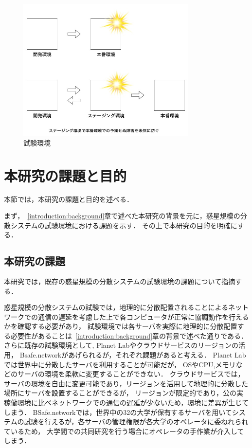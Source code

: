 \begin{figure}[htbp]
  \begin{center}
    \includegraphics[width=0.8\textwidth]{./figures/staging.jpg}
    \caption{試験環境}
  \end{center}
\end{figure}

\section{本研究の課題と目的}
\label{introduction:issue-aim}

本節では，本研究の課題と目的を述べる．

まず，~\ref{introduction:background}章で述べた本研究の背景を元に，惑星規模の分散システムの試験環境における課題を示す．
その上で本研究の目的を明確にする．

\subsection{本研究の課題}
\label{introduction:issue-aim:issue}

本研究では，既存の惑星規模の分散システムの試験環境の課題について指摘する．

惑星規模の分散システムの試験では，地理的に分散配置されることによるネットワークでの通信の遅延を考慮した上で各コンピュータが正常に協調動作を行えるかを確認する必要があり，
試験環境では各サーバを実際に地理的に分散配置する必要性があることは~\ref{introduction:background}章の背景で述べた通りである．
さらに既存の試験環境として, Planet Labやクラウドサービスのリージョンの活用， Bsafe.networkがあげられるが，それぞれ課題があると考える．
Planet Labでは世界中に分散したサーバを利用することが可能だが， OSやCPU,メモリなどのサーバの環境を柔軟に変更することができない．
クラウドサービスでは，サーバの環境を自由に変更可能であり，リージョンを活用して地理的に分散した場所にサーバを設置することができるが，
リージョンが限定的であり，公の実稼働環境に比べネットワークでの通信の遅延が少ないため，環境に差異が生じてしまう．
BSafe.networkでは，世界中の32の大学が保有するサーバを用いてシステムの試験を行えるが，各サーバの管理権限が各大学のオペレータに委ねれられているため，
大学間での共同研究を行う場合にオペレータの手作業が介入してしまう．

